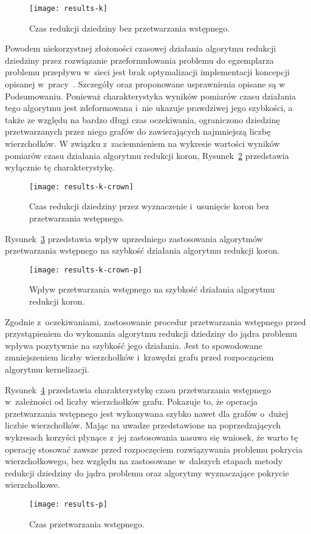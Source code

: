   \begin{figure}
    \caption{Czas redukcji dziedziny bez przetwarzania wstępnego.}
    \label{fig_results_k}
    \centering
      \texttt{[image: results-k]}
  \end{figure}

  Powodem niekorzystnej złożoności czasowej działania algorytmu redukcji dziedziny przez rozwiązanie przeformułowania problemu do egzemplarza problemu przepływu w~sieci jest brak optymalizacji implementacji koncepcji opisanej w~pracy~\cite{KernelizationAlgorithms04}.
  Szczegóły oraz proponowane usprawnienia opisane są w Podsumowaniu.
  Ponieważ charakterystyka wyników pomiarów czasu działania tego algorytmu jest zdeformowana i~nie ukazuje prawdziwej jego szybkości, a także ze względu na bardzo długi czas oczekiwania, ograniczono dziedzinę przetwarzanych przez niego grafów do zawierających najmniejszą liczbę wierzchołków.
  W związku z~zaciemnieniem na wykresie wartości wyników pomiarów czasu działania algorytmu redukcji koron, Rysunek~\ref{fig_results_k_crown} przedstawia wyłącznie tę charakterystykę.

  \begin{figure}
    \caption{Czas redukcji dziedziny przez wyznaczenie i~usunięcie koron bez przetwarzania wstępnego.}
    \label{fig_results_k_crown}
    \centering
      \texttt{[image: results-k-crown]}
  \end{figure}

  Rysunek~\ref{fig_results_k_crown_p} przedstawia wpływ uprzedniego zastosowania algorytmów przetwarzania wstępnego na szybkość działania algorytmu redukcji koron.
  \begin{figure}
    \caption{Wpływ przetwarzania wstępnego na szybkość działania algorytmu redukcji koron.}
    \label{fig_results_k_crown_p}
    \centering
      \texttt{[image: results-k-crown-p]}
  \end{figure}

  Zgodnie z~oczekiwaniami, zastosowanie procedur przetwarzania wstępnego przed przystąpieniem do wykonania algorytmu redukcji dziedziny do jądra problemu wpływa pozytywnie na szybkość jego działania.
  Jest to spowodowane zmniejszeniem liczby wierzchołków i~krawędzi grafu przed rozpocząciem algorytmu kernelizacji.

  Rysunek~\ref{fig_results_p} przedstawia charakterystykę czasu przetwarzania wstępnego w~zależności od liczby wierzchołków grafu.
  Pokazuje to, że operacja przetwarzania wstępnego jest wykonywana szybko nawet dla grafów o~dużej liczbie wierzchołków. Mając na uwadze przedstawione na poprzedzających wykresach korzyści płynące z~jej zastosowania nasuwa się wniosek, że warto tę operację stosować zawsze przed rozpoczęciem rozwiązywania problemu pokrycia wierzchołkowego, bez względu na zastosowane w~dalszych etapach metody redukcji dziedziny do jądra problemu oraz algorytmy wyznaczające pokrycie wierzchołkowe.
  \begin{figure}
    \caption{Czas przetwarzania wstępnego.}
    \label{fig_results_p}
    \centering
      \texttt{[image: results-p]}
  \end{figure}

  